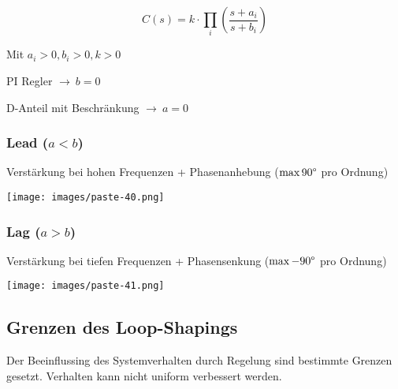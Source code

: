 \documentclass[
  10pt,
  a4paper,
  twocolumn]{article}
\numberwithin{equation}{section}
\begin{document}
\[
C(s)=k\cdot \prod_i \left(\frac{s+a_i}{s+b_i}\right)
\]

Mit \(a_i > 0, b_i > 0, k > 0\)

\begin{tcolorbox}[enhanced jigsaw, coltitle=black, colback=white, breakable, colframe=quarto-callout-note-color-frame, rightrule=.15mm, left=2mm, opacityback=0, leftrule=.75mm, toptitle=1mm, colbacktitle=quarto-callout-note-color!10!white, bottomtitle=1mm, arc=.35mm, bottomrule=.15mm, title=\textcolor{quarto-callout-note-color}{\faInfo}\hspace{0.5em}{PI-Regler \& D-Anteil}, titlerule=0mm, toprule=.15mm, opacitybacktitle=0.6]

PI Regler \(\rightarrow\ b = 0\)

D-Anteil mit Beschränkung \(\rightarrow\ a = 0\)

\end{tcolorbox}

\subsubsection{\texorpdfstring{Lead
(\(a < b\))}{Lead (a \textless{} b)}}\label{lead-a-b}

Verstärkung bei hohen Frequenzen + Phasenanhebung (\(\max 90\degree\)
pro Ordnung)

\texttt{[image: images/paste-40.png]}

\subsubsection{\texorpdfstring{Lag
(\(a > b\))}{Lag (a \textgreater{} b)}}\label{lag-a-b}

Verstärkung bei tiefen Frequenzen + Phasensenkung (\(\max -90\degree\)
pro Ordnung)

\texttt{[image: images/paste-41.png]}

\subsection{Grenzen des Loop-Shapings}\label{grenzen-des-loop-shapings}

Der Beeinflussing des Systemverhalten durch Regelung sind bestimmte
Grenzen gesetzt. Verhalten kann nicht uniform verbessert werden.
\end{document}
